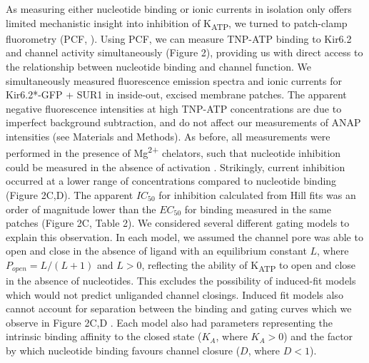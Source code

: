 \documentclass[10pt,lineno, doublespacing]{elife}
\begin{document}
As measuring either nucleotide binding or ionic currents in isolation only offers limited mechanistic insight into inhibition of K\textsubscript{ATP}, we turned to patch-clamp fluorometry (PCF, \cite{RN51, RN114}).
Using PCF, we can measure TNP-ATP binding to Kir6.2 and channel activity simultaneously (Figure 2), providing us with direct access to the relationship between nucleotide binding and channel function.
We simultaneously measured fluorescence emission spectra and ionic currents for Kir6.2*-GFP + SUR1 in inside-out, excised membrane patches.
The apparent negative fluorescence intensities at high TNP-ATP concentrations are due to imperfect background subtraction, and do not affect our measurements of ANAP intensities (see Materials and Methods).
As before, all measurements were performed in the presence of Mg\textsuperscript{2+} chelators, such that nucleotide inhibition could be measured in the absence of activation \citep{RN10, RN82}.
Strikingly, current inhibition occurred at a lower range of concentrations compared to nucleotide binding (Figure 2C,D). The apparent $IC_{50}$ for inhibition calculated from Hill fits was an order of magnitude lower than the $EC_{50}$ for binding measured in the same patches (Figure 2C, Table 2).
We considered several different gating models to explain this observation.
In each model, we assumed the channel pore was able to open and close in the absence of ligand with an equilibrium constant $L$, where $P_{open} = L/(L + 1)$ and $L > 0$, reflecting the ability of K\textsubscript{ATP} to open and close in the absence of nucleotides.
This excludes the possibility of induced-fit models which would not predict unliganded channel closings.
Induced fit models also cannot account for separation between the binding and gating curves which we observe in Figure 2C,D \citep{RN122}.
Each model also had parameters representing the intrinsic binding affinity to the closed state ($K_A$, where $K_A > 0$) and the factor by which nucleotide binding favours channel closure ($D$, where $D < 1$).
\end{document}
